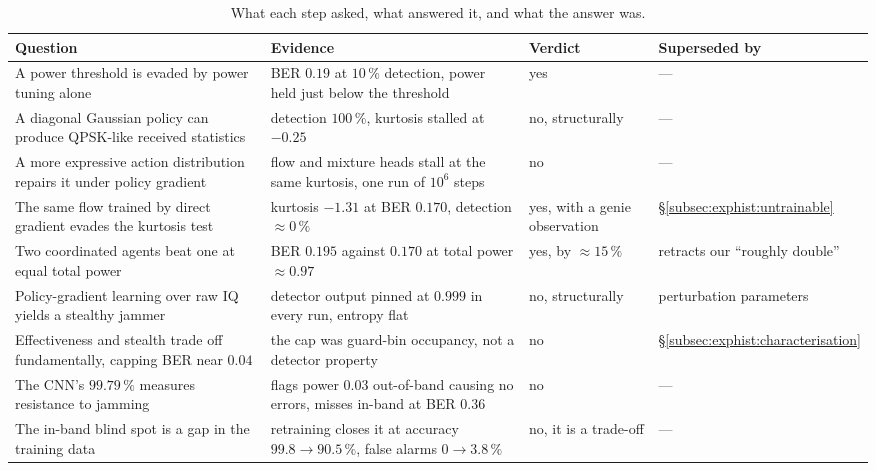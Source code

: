 \begin{table}[!t]
\renewcommand{\arraystretch}{1.3}
\caption{What each step asked, what answered it, and what the answer was.}
\label{tab:verdicts}
\centering
\begin{tabular}{p{} p{} l p{}}
\hline\hline
\textbf{Question} & \textbf{Evidence} & \textbf{Verdict} & \textbf{Superseded by} \\
\hline
A power threshold is evaded by power tuning alone
& BER $0.19$ at $10\,\%$ detection, power held just below the threshold
& yes & --- \\

A diagonal Gaussian policy can produce QPSK-like received statistics
& detection $100\,\%$, kurtosis stalled at $-0.25$
& no, structurally & --- \\

A more expressive action distribution repairs it under policy gradient
& flow and mixture heads stall at the same kurtosis, one run of $10^6$ steps
& no & --- \\

The same flow trained by direct gradient evades the kurtosis test
& kurtosis $-1.31$ at BER $0.170$, detection $\approx 0\,\%$
& yes, with a genie observation
& \S\ref{subsec:exphist:untrainable} \\

Two coordinated agents beat one at equal total power
& BER $0.195$ against $0.170$ at total power $\approx 0.97$
& yes, by $\approx 15\,\%$
& retracts our ``roughly double'' \\

Policy-gradient learning over raw IQ yields a stealthy jammer
& detector output pinned at $0.999$ in every run, entropy flat
& no, structurally
& perturbation parameters \\

Effectiveness and stealth trade off fundamentally, capping BER near $0.04$
& the cap was guard-bin occupancy, not a detector property
& no
& \S\ref{subsec:exphist:characterisation} \\

The CNN's $99.79\,\%$ measures resistance to jamming
& flags power $0.03$ out-of-band causing no errors, misses in-band at BER $0.36$
& no & --- \\

The in-band blind spot is a gap in the training data
& retraining closes it at accuracy $99.8 \to 90.5\,\%$, false alarms $0 \to 3.8\,\%$
& no, it is a trade-off & --- \\


\end{tabular}
\end{table}
